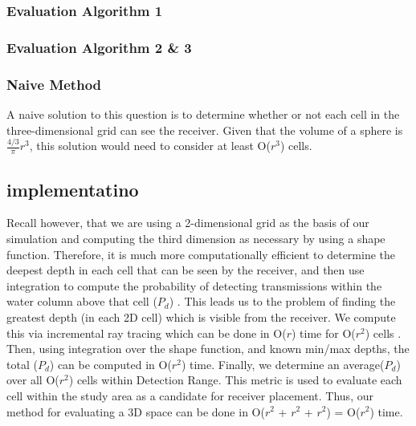 \subsubsection{Evaluation Algorithm 1}

\subsubsection{Evaluation Algorithm 2 \& 3}

\subsubsection{Naive Method}
A naive solution to this question is to determine whether or not each cell in the three-dimensional grid can see the receiver.  Given that the volume of a sphere is $\frac{4/3}\pi r^{3}$, this solution would need to consider at least O($r^{3}$) cells.  

\subsection{implementatino}
Recall however, that we are using a 2-dimensional grid as the basis of our simulation and computing the third dimension as necessary by using a shape function.  Therefore, it is much more computationally efficient to determine the deepest depth in each cell that can be seen by the receiver, and then use integration to compute the probability of detecting transmissions within the water column above that cell ($P_{d}$) .  This leads us to the problem of finding the greatest depth (in each 2D cell) which is visible from the receiver.  We compute this via incremental ray tracing which can be done in  O($r$) time for O($r^{2}$) cells \cite{Akbarzadeh2013}.   Then, using integration over the shape function, and known min/max depths, the total ($P_{d}$) can be computed in O($r^{2}$) time.  Finally, we determine an average($P_{d}$)  over all O($r^{2}$) cells within Detection Range.  This metric is used to evaluate each cell within the study area as a candidate for receiver placement.  Thus, our method for evaluating a 3D space can be done in  O($r^{2}$ + $r^{2}$ + $r^{2}$) = O($r^{2}$) time.

